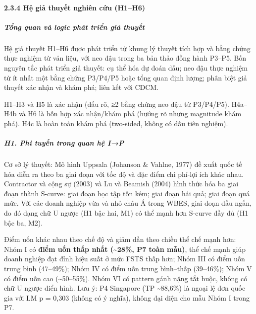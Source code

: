 \documentclass[12pt,a4paper]{article}
\begin{document}
\hypertarget{234-hux1ec7-giux1ea3-thuyux1ebft-nghiuxean-cux1ee9u-h1h6}{%
\paragraph{2.3.4 Hệ giả thuyết nghiên cứu
(H1--H6)}\label{234-hux1ec7-giux1ea3-thuyux1ebft-nghiuxean-cux1ee9u-h1h6}}

\hypertarget{tux1ed5ng-quan-vuxe0-logic-phuxe1t-triux1ec3n-giux1ea3-thuyux1ebft}{%
\subparagraph{Tổng quan và logic phát triển giả
thuyết}\label{tux1ed5ng-quan-vuxe0-logic-phuxe1t-triux1ec3n-giux1ea3-thuyux1ebft}}

Hệ giả thuyết H1--H6 được phát triển từ khung lý thuyết tích hợp và bằng
chứng thực nghiệm từ văn liệu, với neo đậu trong ba bản thảo đồng hành
P3--P5. Bốn nguyên tắc phát triển giả thuyết: cụ thể hóa dự đoán dấu;
neo đậu thực nghiệm từ ít nhất một bằng chứng P3/P4/P5 hoặc tổng quan
định lượng; phân biệt giả thuyết xác nhận và khám phá; liên kết với
CDCM.

H1--H3 và H5 là xác nhận (dấu rõ, ≥2 bằng chứng neo đậu từ P3/P4/P5).
H4a--H4b và H6 là hỗn hợp xác nhận/khám phá (hướng rõ nhưng magnitude
khám phá). H4c là hoàn toàn khám phá (two-sided, không có dấu tiên
nghiệm).

\hypertarget{h1-phi-tuyux1ebfn-trong-quan-hux1ec7-ip}{%
\subparagraph{H1. Phi tuyến trong quan hệ
I→P}\label{h1-phi-tuyux1ebfn-trong-quan-hux1ec7-ip}}

Cơ sở lý thuyết: Mô hình Uppsala (Johanson \& Vahlne, 1977) đề xuất quốc
tế hóa diễn ra theo ba giai đoạn với tốc độ và đặc điểm chi phí-lợi ích
khác nhau. Contractor và cộng sự (2003) và Lu và Beamish (2004) hình
thức hóa ba giai đoạn thành S-curve: giai đoạn học tập tốn kém; giai
đoạn hái quả; giai đoạn quá mức. Với các doanh nghiệp vừa và nhỏ châu Á
trong WBES, giai đoạn đầu ngắn, do đó dạng chữ U ngược (H1 bậc hai, M1)
có thể mạnh hơn S-curve đầy đủ (H1 bậc ba, M2).

Điểm uốn khác nhau theo chế độ và giảm dần theo chiều thể chế mạnh hơn:
Nhóm I có \textbf{điểm uốn thấp nhất (\textasciitilde28\%, P7 toàn
mẫu)}, thể chế mạnh giúp doanh nghiệp đạt đỉnh hiệu suất ở mức FSTS thấp
hơn; Nhóm III có điểm uốn trung bình (47--49\%); Nhóm IV có điểm uốn
trung bình--thấp (39--46\%); Nhóm V có điểm uốn cao
(\textasciitilde50--55\%). Nhóm VI có pattern gánh nặng tắt buộc, không
có chữ U ngược điển hình. Lưu ý: P4 Singapore (TP \textasciitilde88,6\%)
là ngoại lệ đơn quốc gia với LM p = 0,303 (không có ý nghĩa), không đại
diện cho mẫu Nhóm I trong P7.
\end{document}
